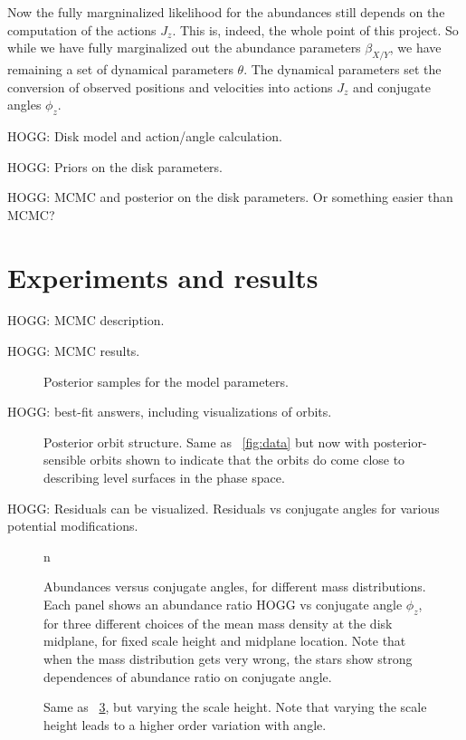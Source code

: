 \documentclass[modern]{aastex63}
\begin{document}
Now the fully margninalized likelihood for the abundances still depends on the computation
of the actions $J_z$. This is, indeed, the whole point of this project.
So while we have fully marginalized out the abundance parameters $\beta_{X/Y}$, we have
remaining a set of dynamical parameters $\theta$.
The dynamical parameters set the conversion of observed positions and velocities into actions $J_z$
and conjugate angles $\phi_z$.

HOGG: Disk model and action/angle calculation.

HOGG: Priors on the disk parameters.

HOGG: MCMC and posterior on the disk parameters. Or something easier than MCMC?

\section{Experiments and results}

HOGG: MCMC description.

HOGG: MCMC results.
\begin{figure}
\caption{Posterior samples for the model parameters.\label{fig:samples}}
\end{figure}

HOGG: best-fit answers, including visualizations of orbits.
\begin{figure}
\caption{Posterior orbit structure. Same as \figurename~\ref{fig:data} but now with
posterior-sensible orbits shown to indicate that the orbits do come close to describing
level surfaces in the phase space.\label{fig:orbits}}
\end{figure}

HOGG: Residuals can be visualized. Residuals vs conjugate angles for various potential modifications.

\begin{figure}
n\caption{Abundances versus conjugate angles, for different mass distributions.
Each panel shows an abundance ratio HOGG vs conjugate angle $\phi_z$, for three different
choices of the mean mass density at the disk midplane, for fixed scale height and midplane
location. Note that when the mass distribution gets very wrong, the stars show strong
dependences of abundance ratio on conjugate angle.\label{fig:density}}
\end{figure}

\begin{figure}
\caption{Same as \figurename~\ref{fig:density}, but varying the scale height. Note that
varying the scale height leads to a higher order variation with angle.\label{fig:scaleheight}}
\end{figure}
\end{document}
